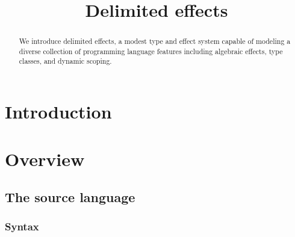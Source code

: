 \documentclass[12pt]{article}
\title{Delimited effects}
\date{}
\begin{document}
  \maketitle

  \begin{abstract}
    We introduce delimited effects, a modest type and effect system capable of modeling a diverse collection of programming language features including algebraic effects, type classes, and dynamic scoping.
  \end{abstract}

  \section{Introduction}

    \iffalse
      \begin{lstlisting}[gobble=4]
        effect IO
          getLine   : String ! IO
          printLine : String -> () ! IO
      \end{lstlisting}

      \begin{lstlisting}[gobble=4]
        effect Monoid a
          mempty  : a ! Monoid a
          mappend : a -> a -> a ! Monoid a
      \end{lstlisting}
    \fi

  \section{Overview}

    \subsection{The source language}

      \subsubsection{Syntax}
\end{document}

